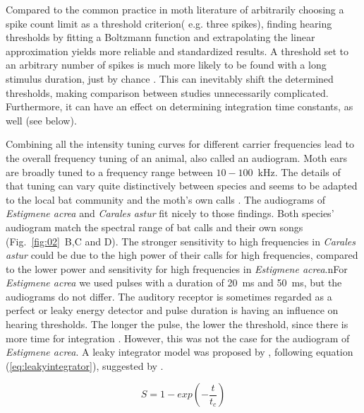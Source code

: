 \documentclass[12pt,a4paper]{article}
\newcommand{\species}[1]{\textit{#1}}
\newcommand{\fig}[2]{(Fig.~#1~#2)}
\begin{document}
Compared to the common practice in moth literature of arbitrarily choosing  a spike count limit as a threshold criterion( e.g. three spikes), finding hearing thresholds by fitting a Boltzmann function and extrapolating the linear approximation yields more reliable and standardized results. A threshold set to an arbitrary number of spikes is much more likely to be found with a long stimulus duration, just by chance \cite{waters2003}. This can inevitably shift the determined thresholds, making comparison between studies unnecessarily complicated. Furthermore, it can have an effect on determining integration time constants, as well (see below).

Combining all the intensity tuning curves for different carrier frequencies lead to the overall frequency tuning of an animal, also called an audiogram. Moth ears are broadly tuned to a frequency range between $10-100$~kHz. The details of that tuning can vary quite distinctively between species and seems to be adapted to the local bat community and the moth's own calls \cite{fullard1984b, terhofstede2013, nakano2014}. The audiograms of \species{Estigmene acrea} and \species{Carales astur} fit nicely to those findings. Both species' audiogram match the spectral range of bat calls and their own songs \fig{\ref{fig:02}}{B,C and D}. The stronger sensitivity to high frequencies in \species{Carales astur} could be due to the high power of their calls for high frequencies, compared to the lower power and sensitivity for high frequencies in \species{Estigmene acrea}.nFor \species{Estigmene acrea} we used pulses with a duration of 20~ms and 50~ms, but the audiograms do not differ. The auditory receptor is sometimes regarded as a perfect or leaky energy detector and pulse duration is having an influence on hearing thresholds. The longer the pulse, the lower the threshold, since there is more time for integration \cite{surlykke1988, tougaard1996, tougaard1998}. However, this was not the case for the audiogram of \species{Estigmene acrea}. 
A leaky integrator model was proposed by \cite{waters1996}, following equation (\ref{eq:leakyintegrator}), suggested by \cite{plomp1959}.

\begin{equation}
\label{eq:leakyintegrator}
S = 1 - exp(-\frac{t}{t_c})
\end{equation}
\end{document}
